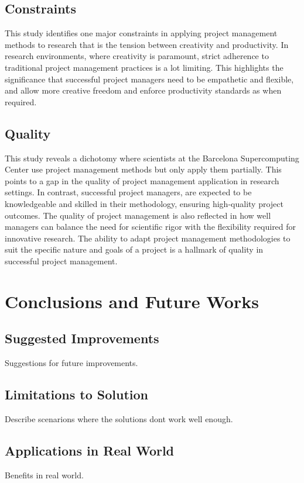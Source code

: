 \documentclass{article}
\begin{document}
\subsection{Constraints}
This study identifies one major constraints in applying project management methods to research that is the tension between creativity and productivity. In research environments, where creativity is paramount, strict adherence to traditional project management practices is a lot limiting. This highlights the significance that successful project managers need to be empathetic and flexible, and allow more creative freedom and enforce productivity standards as when required.

\subsection{Quality}
This study reveals a dichotomy where scientists at the Barcelona Supercomputing Center use project management methods but only apply them partially. This points to a gap in the quality of project management application in research settings. In contrast, successful project managers, are expected to be knowledgeable and skilled in their methodology, ensuring high-quality project outcomes. The quality of project management is also reflected in how well managers can balance the need for scientific rigor with the flexibility required for innovative research. The ability to adapt project management methodologies to suit the specific nature and goals of a project is a hallmark of quality in successful project management.

\section{Conclusions and Future Works}
\subsection{Suggested Improvements}
Suggestions for future improvements.

\subsection{Limitations to Solution}
Describe scenarions where the solutions dont work well enough.

\subsection{Applications in Real World}
Benefits in real world.
\end{document}
